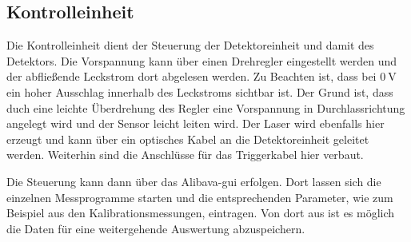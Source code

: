 \subsection{Kontrolleinheit}

Die Kontrolleinheit dient der Steuerung der Detektoreinheit und damit des Detektors.
Die Vorspannung kann über einen Drehregler eingestellt werden und der abfließende Leckstrom dort abgelesen werden.
Zu Beachten ist, dass bei $\SI{0}{\volt}$ ein hoher Ausschlag innerhalb des Leckstroms sichtbar ist.
Der Grund ist, dass duch eine leichte Überdrehung des Regler eine Vorspannung in Durchlassrichtung angelegt wird und der Sensor leicht leiten wird.
Der Laser wird ebenfalls hier erzeugt und kann über ein optisches Kabel an die Detektoreinheit geleitet werden.
Weiterhin sind die Anschlüsse für das Triggerkabel hier verbaut.

Die Steuerung kann dann über das Alibava-gui erfolgen.
Dort lassen sich die einzelnen Messprogramme starten und die entsprechenden Parameter, wie zum Beispiel aus den Kalibrationsmessungen, eintragen.
Von dort aus ist es möglich die Daten für eine weitergehende Auswertung abzuspeichern.
